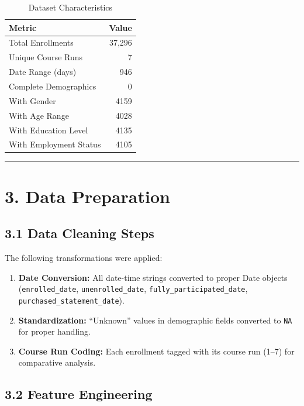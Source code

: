 \documentclass[
]{article}
\begin{document}
\begin{longtable}[t]{lr}
\caption{\label{tab:data-characteristics}Dataset Characteristics}\\
\toprule
Metric & Value\\
\midrule
Total Enrollments & 37,296\\
Unique Course Runs & 7\\
Date Range (days) & 946\\
Complete Demographics & 0\\
With Gender & 4159\\
\addlinespace
With Age Range & 4028\\
With Education Level & 4135\\
With Employment Status & 4105\\
\bottomrule
\end{longtable}

\begin{center}\rule{0.5\linewidth}{0.5pt}\end{center}

\section{3. Data Preparation}\label{data-preparation}

\subsection{3.1 Data Cleaning Steps}\label{data-cleaning-steps}

The following transformations were applied:

\begin{enumerate}
\def\labelenumi{\arabic{enumi}.}
\item
  \textbf{Date Conversion:} All date-time strings converted to proper
  Date objects (\texttt{enrolled\_date}, \texttt{unenrolled\_date},
  \texttt{fully\_participated\_date},
  \texttt{purchased\_statement\_date}).
\item
  \textbf{Standardization:} ``Unknown'' values in demographic fields
  converted to \texttt{NA} for proper handling.
\item
  \textbf{Course Run Coding:} Each enrollment tagged with its course run
  (1--7) for comparative analysis.
\end{enumerate}

\subsection{3.2 Feature Engineering}\label{feature-engineering-1}
\end{document}
